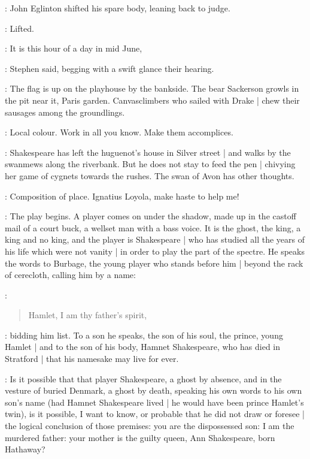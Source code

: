 :
John Eglinton shifted his spare body,
leaning back to judge.

\StephenInt:
Lifted.

\Stephen:
It is this hour of a day in mid June,

:
Stephen said,
begging with a swift glance their hearing.

\Stephen:
The flag is up on the playhouse by the bankside.
The bear Sackerson growls in the pit near it,
Paris garden.
Canvasclimbers who sailed with Drake |
chew their sausages among the groundlings.

\StephenInt:
Local colour.
Work in all you know.
Make them accomplices.

\Stephen:
Shakespeare has left the huguenot's house in Silver street |
and walks by the swanmews along the riverbank.
But he does not stay to feed the pen |
chivying her game of cygnets towards the rushes.
The swan of Avon has other thoughts.

\StephenInt:
Composition of place.
Ignatius Loyola,
make haste to help me!

\Stephen:
The play begins.
A player comes on under the shadow,
made up in the castoff mail of a court buck,
a wellset man with a bass voice.
It is the ghost,
the king,
a king and no king,
and the player is Shakespeare |
who has studied 
all the years of his life which were not vanity |
in order to play the part of the spectre.
He speaks the words to Burbage,
the young player who stands before him |
beyond the rack of cerecloth,
calling him by a name:

\Stephen:
\begin{verse}
    Hamlet, I am thy father's spirit,
\end{verse}

\Stephen:
bidding him list.
To a son he speaks,
the son of his soul,
the prince,
young Hamlet |
and to the son of his body,
Hamnet Shakespeare,
who has died in Stratford |
that his namesake may live for ever.

\Stephen:
Is it possible that that player Shakespeare,
a ghost by absence,
and in the vesture of buried Denmark,
a ghost by death,
speaking his own words to his own son's name
(had Hamnet Shakespeare lived |
he would have been prince Hamlet's twin),
is it possible,
I want to know,
or probable that he did not draw or foresee |
the logical conclusion of those premises:
you are the dispossessed son:
I am the murdered father:
your mother is the guilty queen,
Ann Shakespeare,
born Hathaway?


